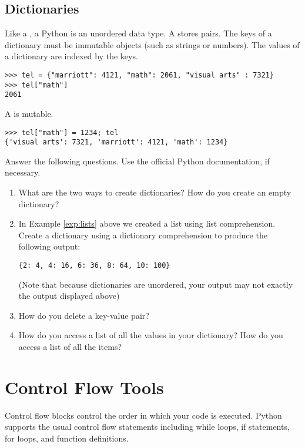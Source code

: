 \subsection*{Dictionaries}
\begin{example}
Like a , a Python  is an unordered data type.  A  stores  pairs. The keys of a dictionary must be immutable objects (such as strings or numbers). The values of a dictionary are indexed by the keys.
\begin{lstlisting}
>>> tel = {"marriott": 4121, "math": 2061, "visual arts" : 7321} 
>>> tel["math"]
2061
\end{lstlisting}
A  is mutable.
\begin{lstlisting}
>>> tel["math"] = 1234; tel
{'visual arts': 7321, 'marriott': 4121, 'math': 1234}
\end{lstlisting}
\end{example}

\begin{problem}
Answer the following questions. Use the official Python documentation, if necessary.
\begin{enumerate}
\item What are the two ways to create dictionaries? How do you create an empty dictionary?
\item In Example \ref{exp:lists} above we created a list using list comprehension. Create a dictionary using a dictionary comprehension to produce the following output:

\begin{lstlisting}
{2: 4, 4: 16, 6: 36, 8: 64, 10: 100}
\end{lstlisting}

(Note that because dictionaries are unordered, your output may not exactly the output displayed above)
\item How do you delete a key-value pair?
\item How do you access a list of all the values in your dictionary?  
How do you access a list of all the items?
\end{enumerate}
\end{problem}


\section*{Control Flow Tools}
Control flow blocks control the order in which your code is executed.
Python supports the usual control flow statements 
including while loops, if statements, for loops, and function definitions. 

